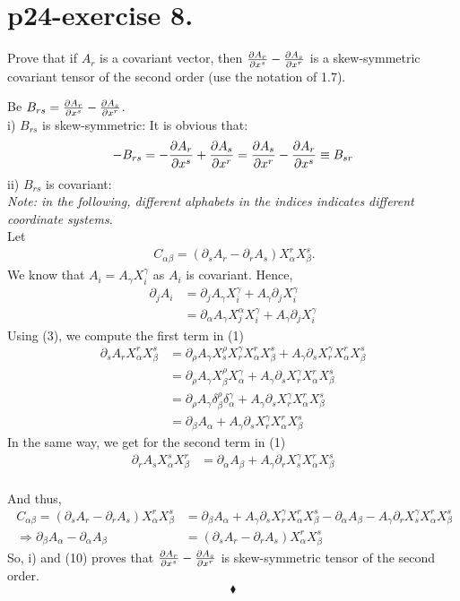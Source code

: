 \section{p24-exercise 8.}
\begin{tcolorbox}
Prove that if $A_{r}$ is a covariant vector, then $\pdv{A_{r}}{x^{s}} - \pdv{A_{s}}{x^{r}}$ is a skew-symmetric covariant tensor of the second order (use the notation of 1.7).
\end{tcolorbox}
Be $B_{rs} = \pdv{A_{r}}{x^{s}} - \pdv{A_{s}}{x^{r}}$.\\
i) $B_{rs}$ is skew-symmetric:
It is obvious that:$$-B_{rs} = -\pdv{A_{r}}{x^{s}} + \pdv{A_{s}}{x^{r}} = \pdv{A_{s}}{x^{r}}-\pdv{A_{r}}{x^{s}}\equiv B_{sr}$$
ii)  $B_{rs}$ is covariant:\\
\textit{Note: in the following, different alphabets in the indices indicates different coordinate systems.}\\
Let 
\begin{align}
\ C_{\alpha\beta} = (\partial_sA_r - \partial_rA_s)X^r_{\alpha}X^s_{\beta}. 
\end{align}
We know that $A_i= A_{\gamma}X^{\gamma}_i$  as $A_i$ is covariant. Hence,
\begin{align}
\partial_jA_i &= \partial_j A_{\gamma} X^{\gamma}_i + A_{\gamma}\partial_jX^{\gamma}_i\\
\ &= \partial_{\alpha} A_{\gamma} X^{\alpha}_j X^{\gamma}_i + A_{\gamma}\partial_jX^{\gamma}_i
\end{align}
Using (3), we compute the first term in (1)
\begin{align}
\partial_sA_rX^r_{\alpha}X^s_{\beta}&=  \partial_{\rho} A_{\gamma} X^{\rho}_s X^{\gamma}_rX^r_{\alpha}X^s_{\beta}+A_{\gamma}\partial_sX^{\gamma}_rX^r_{\alpha}X^s_{\beta}\\
\ &=  \partial_{\rho} A_{\gamma} X^{\rho}_{\beta} X^{\gamma}_{\alpha}+A_{\gamma}\partial_sX^{\gamma}_rX^r_{\alpha}X^s_{\beta}\\
\ &=  \partial_{\rho} A_{\gamma} \delta^{\rho}_{\beta} \delta^{\gamma}_{\alpha}+A_{\gamma}\partial_sX^{\gamma}_rX^r_{\alpha}X^s_{\beta}\\
\ &=  \partial_{\beta} A_{\alpha} +A_{\gamma}\partial_sX^{\gamma}_rX^r_{\alpha}X^s_{\beta}
\end{align}
In the same way, we get for the second term in (1)
\begin{align}
\partial_rA_sX^s_{\alpha}X^r_{\beta} &=  \partial_{\alpha} A_{\beta} + A_{\gamma}\partial_rX^{\gamma}_sX^r_{\alpha}X^s_{\beta}
\end{align}\\
And thus,
\begin{align}
\ C_{\alpha\beta} =(\partial_sA_r - \partial_rA_s)X^r_{\alpha}X^s_{\beta} &=\partial_{\beta} A_{\alpha} +A_{\gamma}\partial_sX^{\gamma}_rX^r_{\alpha}X^s_{\beta} - \partial_{\alpha} A_{\beta} - A_{\gamma}\partial_rX^{\gamma}_sX^r_{\alpha}X^s_{\beta}\\
\ \Rightarrow \partial_{\beta} A_{\alpha}  - \partial_{\alpha} A_{\beta} &=  (\partial_sA_r - \partial_rA_s)X^r_{\alpha}X^s_{\beta}
\end{align}
So, i) and (10) proves that $\pdv{A_{r}}{x^{s}} - \pdv{A_{s}}{x^{r}}$ is skew-symmetric tensor of the second order.
$$\blacklozenge$$
\pagebreak[4]

